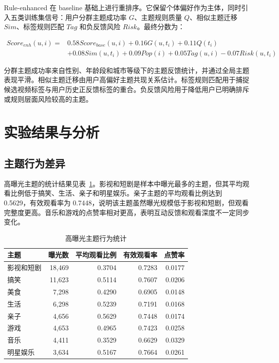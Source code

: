 \documentclass[UTF8,a4paper,12pt,fontset=none]{ctexart}
\begin{document}
Rule-enhanced 在 baseline 基础上进行重排序。它保留个体偏好作为主体，同时引入五类训练集信号：用户分群主题成功率 \(G\)、主题规则质量 \(Q\)、相似主题迁移 \(Sim\)、标签规则匹配 \(Tag\) 和负反馈风险 \(Risk\)。最终分数为：

\begin{align}
Score_{enh}(u,i)=&0.58Score_{base}(u,i)+0.16G(u,t_i)+0.11Q(t_i) \\
&+0.08Sim(u,t_i)+0.09Pop(i)+0.05Tag(u,i)-0.07Risk(u,t_i)
\end{align}

分群主题成功率来自性别、年龄段和城市等级下的主题反馈统计，并通过全局主题表现平滑。相似主题迁移由用户高偏好主题共现关系估计。标签规则匹配用于捕捉候选视频标签与用户历史正反馈标签的重合。负反馈风险用于降低用户已明确排斥或规则层面风险较高的主题。

\section{实验结果与分析}

\subsection{主题行为差异}

高曝光主题的统计结果见表~\ref{tab:theme-summary}。影视和短剧是样本中曝光最多的主题，但其平均观看比例低于搞笑、生活、亲子和明星娱乐。亲子主题的平均观看比例达到 0.5629，有效观看率为 0.7448，说明该主题虽然曝光规模低于影视和短剧，但观看完整度更高。音乐和游戏的点赞率相对更高，表明互动反馈和观看深度不一定同步变化。

\begin{table}[H]
\centering
\caption{高曝光主题行为统计}
\label{tab:theme-summary}
\begin{tabular}{lrrrr}
\toprule
主题 & 曝光数 & 平均观看比例 & 有效观看率 & 点赞率 \\
\midrule
影视和短剧 & 18,469 & 0.3704 & 0.7283 & 0.0177 \\
搞笑 & 11,623 & 0.5114 & 0.7607 & 0.0206 \\
美食 & 7,298 & 0.4290 & 0.6905 & 0.0148 \\
生活 & 6,298 & 0.5239 & 0.7191 & 0.0168 \\
亲子 & 4,656 & 0.5629 & 0.7448 & 0.0174 \\
游戏 & 4,653 & 0.4965 & 0.7423 & 0.0258 \\
音乐 & 4,411 & 0.3529 & 0.6629 & 0.0329 \\
明星娱乐 & 3,634 & 0.5167 & 0.7664 & 0.0261 \\
\bottomrule
\end{tabular}
\end{table}
\end{document}
